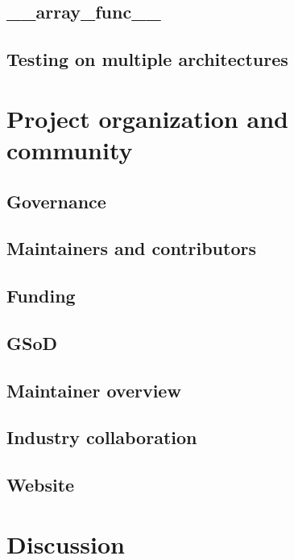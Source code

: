 \documentclass[fleqn,10pt]{wlscirep}
\begin{document}
\subsection*{\_\_array\_func\_\_}

\subsection*{Testing on multiple architectures}

\section*{Project organization and community}

\subsection*{Governance}

\subsection*{Maintainers and contributors}

\subsection*{Funding}


\subsection*{GSoD}

\subsection*{Maintainer overview}


\subsection*{Industry collaboration}


\subsection*{Website}

\section*{Discussion}
\end{document}
